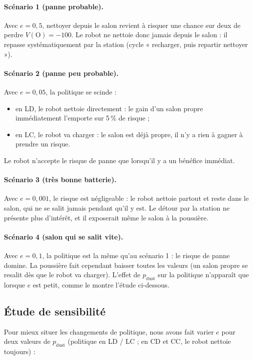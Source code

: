 \documentclass[11pt,a4paper]{article}
\newcommand{\pd}{p_{\text{dust}}}
\begin{document}
\paragraph{Scénario 1 (panne probable).}
Avec $e = 0{,}5$, nettoyer depuis le salon revient à risquer une chance sur deux de perdre $V(\text{O}) = -100$.
Le robot ne nettoie donc jamais depuis le salon : il repasse systématiquement par la station
(cycle « recharger, puis repartir nettoyer »).

\paragraph{Scénario 2 (panne peu probable).}
Avec $e = 0{,}05$, la politique se scinde :
\begin{itemize}
  \item en LD, le robot nettoie directement : le gain d'un salon propre immédiatement l'emporte sur 5\,\% de risque ;
  \item en LC, le robot va charger : le salon est déjà propre, il n'y a rien à gagner à prendre un risque.
\end{itemize}
Le robot n'accepte le risque de panne que lorsqu'il y a un bénéfice immédiat.

\paragraph{Scénario 3 (très bonne batterie).}
Avec $e = 0{,}001$, le risque est négligeable : le robot nettoie partout et reste dans le salon, qui ne se
salit jamais pendant qu'il y est. Le détour par la station ne présente plus d'intérêt, et il exposerait même le
salon à la poussière.

\paragraph{Scénario 4 (salon qui se salit vite).}
Avec $e = 0{,}1$, la politique est la même qu'au scénario 1 : le risque de panne domine. La poussière fait
cependant baisser toutes les valeurs (un salon propre se resalit dès que le robot va charger).
L'effet de $\pd$ sur la politique n'apparaît que lorsque $e$ est petit, comme le montre l'étude ci-dessous.

\subsection{Étude de sensibilité}

Pour mieux situer les changements de politique, nous avons fait varier $e$ pour deux valeurs de $\pd$
(politique en LD / LC ; en CD et CC, le robot nettoie toujours) :
\end{document}
